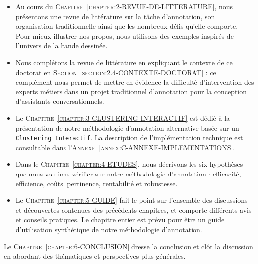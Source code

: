 		\begin{itemize}
			\item Au cours du \textsc{Chapitre~\ref{chapter:2-REVUE-DE-LITTERATURE}}, nous présentons une revue de littérature sur la tâche d'annotation, son organisation traditionnelle ainsi que les nombreux défis qu'elle comporte.
			Pour mieux illustrer nos propos, nous utilisons des exemples inspirés de l'univers de la bande dessinée.
			\item Nous complétons la revue de littérature en expliquant le contexte de ce doctorat en \textsc{Section~\ref{section:2.4-CONTEXTE-DOCTORAT}} : ce complément nous permet de mettre en évidence la difficulté d'intervention des experts métiers dans un projet traditionnel d'annotation pour la conception d'assistants conversationnels.
			\item Le \textsc{Chapitre~\ref{chapter:3-CLUSTERING-INTERACTIF}} est dédié à la présentation de notre méthodologie d'annotation alternative basée sur un \texttt{Clustering Interactif}.
			La description de l'implémentation technique est consultable dans l'\textsc{Annexe~\ref{annex:C-ANNEXE-IMPLEMENTATIONS}}.
			\item Dans le \textsc{Chapitre~\ref{chapter:4-ETUDES}}, nous décrivons les six hypothèses que nous voulions vérifier sur notre méthodologie d'annotation : efficacité, efficience, coûts, pertinence, rentabilité et robustesse.
			\item Le \textsc{Chapitre~\ref{chapter:5-GUIDE}} fait le point sur l'ensemble des discussions et découvertes contenues des précédents chapitres, et comporte différents avis et conseils pratiques.
			Le chapitre entier est prévu pour être un guide d'utilisation synthétique de notre méthodologie d'annotation.
		\end{itemize}
		
		Le \textsc{Chapitre~\ref{chapter:6-CONCLUSION}} dresse la conclusion et clôt la discussion en abordant des thématiques et perspectives plus générales.
